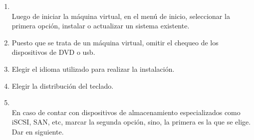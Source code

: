 \documentclass[11pt]{article}
\begin{document}
		\begin{enumerate}
			\item 
				\begin{minipage}[t]{\linewidth}
			          \raggedright
			          \medskip
			          \\Luego de iniciar la máquina virtual, en el menú de inicio, seleccionar la primera opción, instalar o actualizar un sistema existente.
			    \end{minipage}
			
			\item Puesto que se trata de un máquina virtual, omitir el chequeo de los dispositivos de DVD o usb.
			\item Elegir el idioma utilizado para realizar la instalación.
			\item Elegir la distribución del teclado.

			\item 
				\begin{minipage}[t]{\linewidth}
			          \raggedright
			          \medskip
			          \\En caso de contar con dispositivos de almacenamiento especializados como iSCSI, SAN, etc, marcar la segunda opción, sino, la primera es la que se elige. Dar en siguiente.
			    \end{minipage}			


\end{enumerate}
\end{document}
